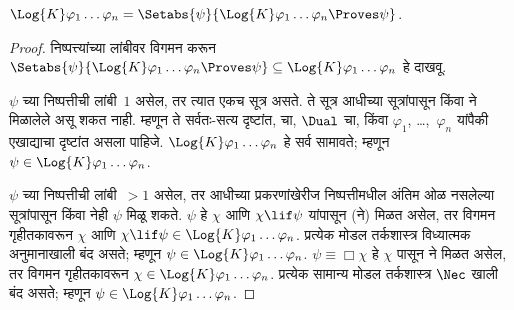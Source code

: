 \begin{prop}
  $\Log{K} \varphi_1 \dots \varphi_n = \Setabs{\psi}{\Log{K} \varphi_1 \dots \varphi_n \Proves \psi}$.
\end{prop}

\begin{proof}
  निष्पत्त्यांच्या लांबीवर विगमन करून
  $\Setabs{\psi}{\Log{K} \varphi_1 \dots \varphi_n \Proves \psi} \subseteq
  \Log{K} \varphi_1 \dots \varphi_n$ हे दाखवू.

  $\psi$ च्या निष्पत्तीची लांबी~$1$ असेल,
  तर त्यात एकच सूत्र असते. ते सूत्र आधीच्या
  सूत्रांपासून \MP{} किंवा \Nec ने मिळालेले
  असू शकत नाही. म्हणून ते सर्वतः-सत्य दृष्टांत,
   चा, $\Dual$ चा,
  किंवा $\varphi_1$, \dots,~$\varphi_n$ यांपैकी एखाद्याचा
  दृष्टांत असला पाहिजे. $\Log{K}\varphi_1\dots\varphi_n$
  हे सर्व सामावते; म्हणून $\psi \in \Log{K}\varphi_1
  \dots \varphi_n$.

  $\psi$ च्या निष्पत्तीची लांबी~$> 1$
  असेल, तर आधीच्या प्रकरणांखेरीज निष्पत्तीमधील अंतिम ओळ नसलेल्या सूत्रांपासून
  \MP{} किंवा \Nec{} नेही
  $\psi$ मिळू शकते. $\psi$ हे $\chi$ आणि
  $\chi \lif \psi$ यांपासून (\MP ने) मिळत असेल,
  तर विगमन गृहीतकावरून $\chi$ आणि
  $\chi \lif \psi \in
  \Log{K}\varphi_1 \dots \varphi_n$. प्रत्येक मोडल
  तर्कशास्त्र विध्यात्मक अनुमानाखाली बंद असते;
  म्हणून $\psi \in \Log{K}\varphi_1 \dots
  \varphi_n$. $\psi \equiv \Box \chi$ हे $\chi$
  पासून \Nec ने मिळत असेल, तर विगमन
  गृहीतकावरून $\chi
  \in \Log{K}\varphi_1 \dots \varphi_n$. प्रत्येक
  सामान्य मोडल तर्कशास्त्र $\Nec$ खाली बंद असते;
  म्हणून $\psi \in
  \Log{K}\varphi_1\dots\varphi_n$.


\end{proof}
